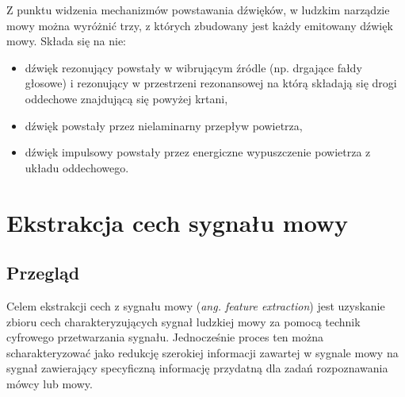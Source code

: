 Z punktu widzenia mechanizmów powstawania dźwięków, w ludzkim narządzie mowy można wyróżnić trzy, z których zbudowany jest każdy emitowany dźwięk mowy. Składa się na nie:
\begin{itemize}
\item dźwięk rezonujący powstały w wibrującym źródle (np. drgające fałdy głosowe) i rezonujący w przestrzeni rezonansowej na którą składają się drogi oddechowe znajdującą się powyżej krtani,
\item dźwięk powstały przez nielaminarny przepływ powietrza,
\item dźwięk impulsowy powstały przez energiczne wypuszczenie powietrza z układu oddechowego.
\end{itemize}

\section{Ekstrakcja cech sygnału mowy}

\label{featureextraction}
\subsection{Przegląd}
Celem ekstrakcji cech z sygnału mowy (\textit{ang. feature extraction}) jest uzyskanie zbioru cech charakteryzujących sygnał ludzkiej mowy za pomocą technik cyfrowego przetwarzania sygnału. Jednocześnie proces ten można scharakteryzować jako redukcję szerokiej informacji zawartej w sygnale mowy na sygnał zawierający specyficzną informację przydatną dla zadań rozpoznawania mówcy lub mowy. 



